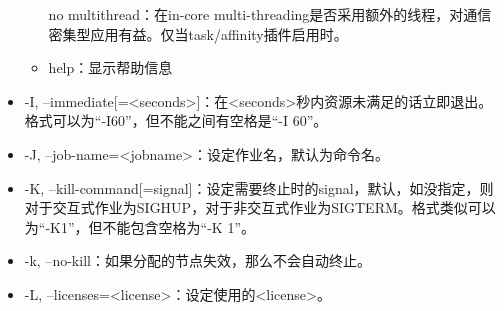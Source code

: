 \begin{itemize}
\begin{itemize}
    \item [no]multithread：在in-core multi-threading是否采用额外的线程，对通信密集型应用有益。仅当task/affinity插件启用时。
    \item help：显示帮助信息
\end{itemize}
    \item -I, --immediate[=<seconds>]：在<seconds>秒内资源未满足的话立即退出。格式可以为``-I60''，但不能之间有空格是``-I 60''。
    \item -J, --job-name=<jobname>：设定作业名，默认为命令名。
    \item -K, --kill-command[=signal]：设定需要终止时的signal，默认，如没指定，则对于交互式作业为SIGHUP，对于非交互式作业为SIGTERM。格式类似可以为``-K1''，但不能包含空格为``-K 1''。
    \item -k, --no-kill：如果分配的节点失效，那么不会自动终止。
    \item -L, --licenses=<license>：设定使用的<license>。
%
%
%

\end{itemize}
